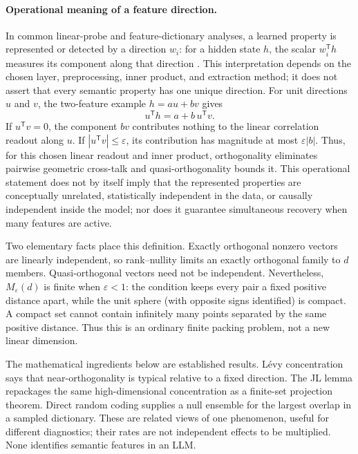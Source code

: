 \documentclass[
  aps,
  reprint,
  superscriptaddress,
  floatfix,
  nofootinbib,
  longbibliography
]{revtex4-2}
\newcommand{\T}{^{\mathsf{T}}}
\begin{document}
\paragraph{Operational meaning of a feature direction.}
In common linear-probe and feature-dictionary analyses, a learned property is
represented or detected by a direction $w_i$: for a hidden state $h$, the
scalar $w_i\T h$ measures its component along that direction
\cite{elhage2022superposition,bricken2023monosemanticity,li2025geometry}.
This interpretation depends on the chosen layer, preprocessing, inner product,
and extraction method; it does not assert that every semantic property has one
unique direction.  For unit directions $u$ and $v$, the two-feature example
$h=a u+b v$ gives
\[
u\T h=a+b\,u\T v.
\]
If $u\T v=0$, the component $b v$ contributes nothing to the linear
correlation readout along $u$.  If $|u\T v|\leq\varepsilon$, its contribution
has magnitude at most $\varepsilon|b|$.  Thus, for this chosen linear readout
and inner product, orthogonality eliminates pairwise geometric cross-talk and
quasi-orthogonality bounds it.  This operational statement does not by itself
imply that the represented properties are conceptually unrelated, statistically
independent in the data, or causally independent inside the model; nor does it
guarantee simultaneous recovery when many features are active.

Two elementary facts place this definition.  Exactly orthogonal nonzero
vectors are linearly independent, so rank--nullity limits an exactly
orthogonal family to $d$ members.  Quasi-orthogonal vectors need not be
independent.  Nevertheless, $M_\varepsilon(d)$ is finite when
$\varepsilon<1$: the condition keeps every pair a fixed positive distance
apart, while the unit sphere (with opposite signs identified) is compact.  A
compact set cannot contain infinitely many points separated by the same
positive distance.  Thus this is an ordinary finite packing problem, not a new
linear dimension.

The mathematical ingredients below are established results.  L\'evy
concentration says that near-orthogonality is typical relative to a fixed
direction.  The JL lemma repackages the same high-dimensional concentration as
a finite-set projection theorem.  Direct random coding supplies a null
ensemble for the largest overlap in a sampled dictionary.  These are related
views of one phenomenon, useful for different diagnostics; their rates are not
independent effects to be multiplied.  None identifies semantic features in
an LLM.
\end{document}

